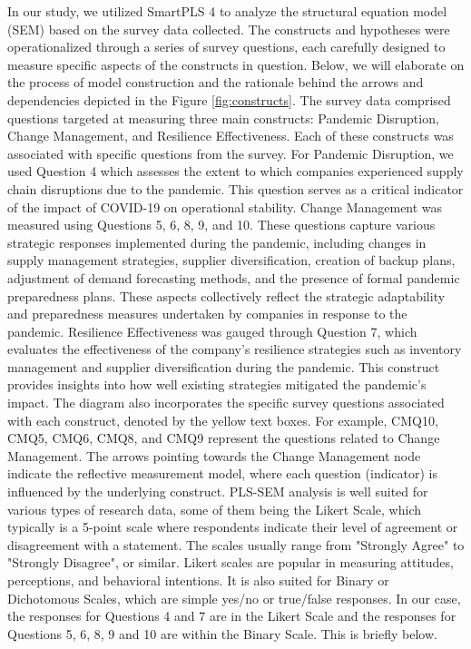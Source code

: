 In our study, we utilized SmartPLS 4 \parencite{smartpls2024} to analyze the structural equation model (SEM) based on the survey data collected. The constructs and hypotheses were operationalized through a series of survey questions, each carefully designed to measure specific aspects of the constructs in question. Below, we will elaborate on the process of model construction and the rationale behind the arrows and dependencies depicted in the Figure \ref{fig:constructs}. The survey data comprised questions targeted at measuring three main constructs: Pandemic Disruption, Change Management, and Resilience Effectiveness. Each of these constructs was associated with specific questions from the survey. For Pandemic Disruption, we used Question 4 which assesses the extent to which companies experienced supply chain disruptions due to the pandemic. This question serves as a critical indicator of the impact of COVID-19 on operational stability. Change Management was measured using Questions 5, 6, 8, 9, and 10. These questions capture various strategic responses implemented during the pandemic, including changes in supply management strategies, supplier diversification, creation of backup plans, adjustment of demand forecasting methods, and the presence of formal pandemic preparedness plans. These aspects collectively reflect the strategic adaptability and preparedness measures undertaken by companies in response to the pandemic. Resilience Effectiveness was gauged through Question 7, which evaluates the effectiveness of the company's resilience strategies such as inventory management and supplier diversification during the pandemic. This construct provides insights into how well existing strategies mitigated the pandemic's impact. The diagram also incorporates the specific survey questions associated with each construct, denoted by the yellow text boxes. For example, CMQ10, CMQ5, CMQ6, CMQ8, and CMQ9 represent the questions related to Change Management. The arrows pointing towards the Change Management node indicate the reflective measurement model, where each question (indicator) is influenced by the underlying construct. PLS-SEM analysis is well suited for various types of research data, some of them being the Likert Scale, which typically is a 5-point scale where respondents indicate their level of agreement or disagreement with a statement. The scales usually range from "Strongly Agree" to "Strongly Disagree", or similar. Likert scales are popular in measuring attitudes, perceptions, and behavioral intentions. It is also suited for Binary or Dichotomous Scales, which are simple yes/no or true/false responses. In our case, the responses for Questions 4 and 7 are in the Likert Scale and the responses for Questions 5, 6, 8, 9 and 10 are within the Binary Scale. This is briefly below.

